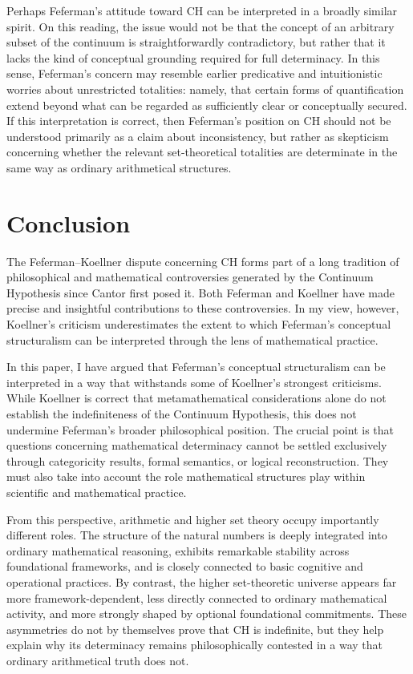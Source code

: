 \documentclass[11pt,a4paper]{article}
\theoremstyle{plain}
\begin{document}
Perhaps Feferman's attitude toward CH can be interpreted in a broadly similar spirit. On this reading, the issue would not be that the concept of an arbitrary subset of the continuum is straightforwardly contradictory, but rather that it lacks the kind of conceptual grounding required for full determinacy. In this sense, Feferman's concern may resemble earlier predicative and intuitionistic worries about unrestricted totalities: namely, that certain forms of quantification extend beyond what can be regarded as sufficiently clear or conceptually secured. If this interpretation is correct, then Feferman's position on CH should not be understood primarily as a claim about inconsistency, but rather as skepticism concerning whether the relevant set-theoretical totalities are determinate in the same way as ordinary arithmetical structures.

\section{Conclusion}
\label{conclusion}

The Feferman--Koellner dispute concerning CH forms part of a long tradition of philosophical and mathematical controversies generated by the Continuum Hypothesis since Cantor first posed it. Both Feferman and Koellner have made precise and insightful contributions to these controversies. In my view, however, Koellner's criticism underestimates the extent to which Feferman's conceptual structuralism can be interpreted through the lens of mathematical practice.

In this paper, I have argued that Feferman's conceptual structuralism can be interpreted in a way that withstands some of Koellner's strongest criticisms. While Koellner is correct that metamathematical considerations alone do not establish the indefiniteness of the Continuum Hypothesis, this does not undermine Feferman's broader philosophical position. The crucial point is that questions concerning mathematical determinacy cannot be settled exclusively through categoricity results, formal semantics, or logical reconstruction. They must also take into account the role mathematical structures play within scientific and mathematical practice.

From this perspective, arithmetic and higher set theory occupy importantly different roles. The structure of the natural numbers is deeply integrated into ordinary mathematical reasoning, exhibits remarkable stability across foundational frameworks, and is closely connected to basic cognitive and operational practices. By contrast, the higher set-theoretic universe appears far more framework-dependent, less directly connected to ordinary mathematical activity, and more strongly shaped by optional foundational commitments. These asymmetries do not by themselves prove that CH is indefinite, but they help explain why its determinacy remains philosophically contested in a way that ordinary arithmetical truth does not.
\end{document}
